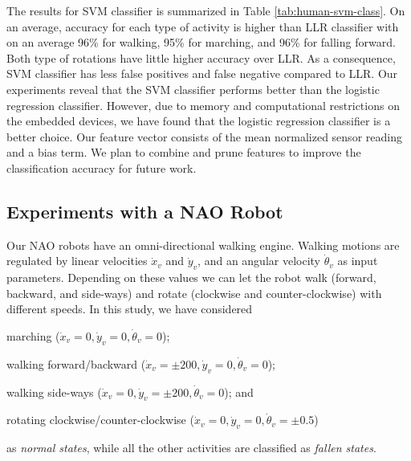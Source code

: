 \documentclass[letterpaper]{article}
\begin{document}
\begin{sloppy}
\begin{figure}[!t]
\end{figure}

The results for SVM classifier is summarized in Table \ref{tab:human-svm-class}. On an average, 
accuracy for each type of activity is higher than LLR classifier with on an average 96\% for 
walking, 95\% for marching, and 96\% for falling forward. Both type of rotations have little higher accuracy over LLR. As a consequence, SVM classifier has less false positives and false negative compared to LLR.  Our experiments reveal that the SVM classifier performs better than the logistic regression classifier. However, due to memory and 
computational restrictions on the embedded devices, we have found that the logistic 
regression classifier is a better choice.  Our feature vector consists of the mean normalized sensor 
reading and a bias term. We plan to combine and prune features to improve the classification 
accuracy for future work.  


\subsection{Experiments with a NAO Robot}



Our NAO robots have an omni-directional walking engine.  
Walking motions are regulated by linear velocities $\dot{x}_v$ and $\dot{y}_v$, and an 
angular velocity $\dot{\theta}_v$ as input parameters. Depending on these
values we can let the robot walk (forward, backward, and side-ways) and rotate (clockwise and
counter-clockwise) with different speeds. In this study, we have considered \begin{inparaenum}[(1)]
\item marching ($\dot{x}_v = 0 , \dot{y}_v = 0, \dot{\theta}_v = 0$); \item walking  
forward/backward ($\dot{x}_v = \pm200
, \dot{y}_v = 0, \dot{\theta}_v = 0$);  \item walking side-ways ($\dot{x}_v = 0, \dot{y}_v = 
\pm200, \dot{\theta}_v = 0$); and  \item rotating clockwise/counter-clockwise
($\dot{x}_v = 0 , \dot{y}_v = 0, \dot{\theta}_v = \pm 0.5$) \end{inparaenum} as {\em normal states}, 
while all the other activities are classified as {\em fallen states}. 


\end{sloppy}
\end{document}
